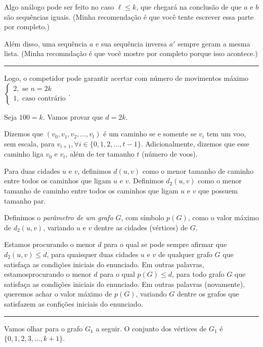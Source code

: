 \documentclass[10pt, a4paper]{article}
\newcommand{\sep}{
	
	\begin{center}
		\vspace{-.6em}
		\rule{10cm}{.5pt}
		\vspace{-.3em}
	\end{center}

}
\begin{document}
	Algo análogo pode ser feito no caso $\ell \le k$, que chegará na conclusão de que $a$ e $b$ são sequências iguais. (Minha recomendação é que você tente escrever essa parte por completo.)

	Além disso, uma sequência $a$ e sua sequência inversa $a'$ sempre geram a mesma lista. (Minha recomndação é que você mostre por completo porque isso acontece.)

	\sep

	Logo, o competidor pode garantir acertar com número de movimentos máximo $
	\begin{cases}
		2, \text{ se $n = 2k$}\\ 
		1, \text{ caso contrário}
	\end{cases}$.
	\vfill


	\newpage

	Seja $100 = k$. Vamos provar que $d = 2k$.

	Dizemos que $(v_0, v_1, v_2, \dots, v_t)$ é um caminho se e somente se $v_i$ tem um voo, sem escala, para $v_{i+1}, \forall i \in \{0, 1, 2, \dots, t-1\}$. Adicionalmente, dizemos que esse caminho liga $v_0$ e $v_t$, além de ter tamanho $t$ (número de voos).

	Para duas cidades $u$ e $v$, definimos $d(u, v)$ como o menor tamanho de caminho entre todos os caminhos que ligam $u$ e $v$. Definimos $d_2(u, v)$ como o menor tamanho de caminho entre todos os caminhos que ligam $u$ e $v$ que possuem tamanho par. 

	Definimos o \emph{parâmetro de um grafo $G$}, com símbolo $p(G)$, como o valor máximo de $d_2(u, v)$, variando $u$ e $v$ dentre as cidades (vértices) de $G$.

	Estamos procurando o menor $d$ para o qual se pode sempre afirmar que $d_2(u, v) \le d$, para quaisquer duas cidades $u$ e $v$ de qualquer grafo $G$ que satisfaça as condições iniciais do enunciado. Em outras palavras, estamosprocurando o menor $d$ para o qual $p(G) \le d$, para todo grafo $G$ que satisfaça as condições iniciais do enunciado. Em outras palavras (novamente), queremos achar o valor máximo de $p(G)$, variando $G$ dentre os grafos que satisfazem as confições iniciais do enunciado.

	\sep

	Vamos olhar para o grafo $G_1$ a seguir. O conjunto dos vértices de $G_1$ é $\{0, 1, 2, 3, \dots, k+1\}$.
\end{document}
